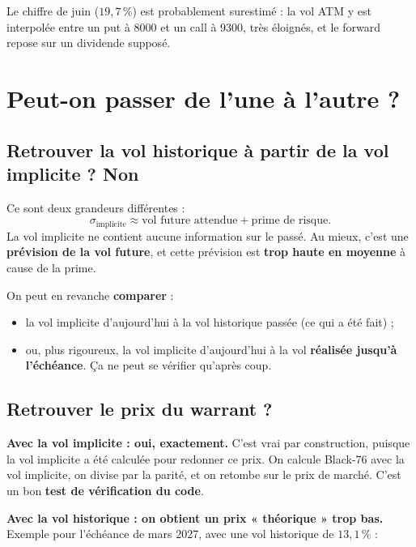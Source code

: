 \documentclass[11pt,a4paper]{article}
\begin{document}
\begin{alimite}
Le chiffre de juin ($19{,}7\,\%$) est probablement surestimé : la vol ATM y est interpolée entre un put
à 8000 et un call à 9300, très éloignés, et le forward repose sur un dividende supposé.
\end{alimite}

\section{Peut-on passer de l'une à l'autre ?}

\subsection{Retrouver la vol historique à partir de la vol implicite ? Non}

Ce sont deux grandeurs différentes :
\[
  \sigma_{\text{implicite}} \approx \text{vol future attendue} + \text{prime de risque}.
\]
La vol implicite ne contient aucune information sur le passé. Au mieux, c'est une
\textbf{prévision de la vol future}, et cette prévision est \textbf{trop haute en moyenne}
à cause de la prime.

On peut en revanche \textbf{comparer} :
\begin{itemize}[leftmargin=*]
  \item la vol implicite d'aujourd'hui à la vol historique passée (ce qui a été fait) ;
  \item ou, plus rigoureux, la vol implicite d'aujourd'hui à la vol \textbf{réalisée jusqu'à l'échéance}.
        Ça ne peut se vérifier qu'après coup.
\end{itemize}

\subsection{Retrouver le prix du warrant ?}

\textbf{Avec la vol implicite : oui, exactement.} C'est vrai par construction, puisque la vol implicite
a été calculée pour redonner ce prix. On calcule Black-76 avec la vol implicite, on divise par la parité,
et on retombe sur le prix de marché. C'est un bon \textbf{test de vérification du code}.

\textbf{Avec la vol historique : on obtient un prix « théorique » trop bas.}
Exemple pour l'échéance de mars 2027, avec une vol historique de $13{,}1\,\%$ :
\end{document}
